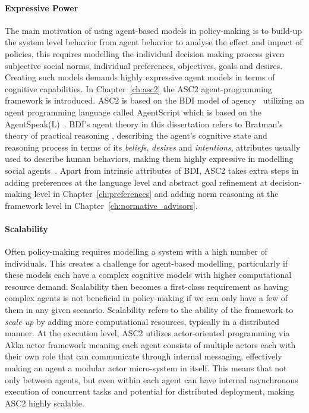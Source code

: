 \paragraph{Expressive Power} The main motivation of using agent-based models in policy-making is to build-up the system level behavior from agent behavior to analyse the effect and impact of policies, this requires  modelling the individual decision making process given subjective social norms, individual preferences, objectives, goals and desires. Creating such models demands highly expressive agent models in terms of cognitive capabilities. In Chapter~\ref{ch:asc2} the ASC2 agent-programming framework is introduced. ASC2 is based on the BDI model of agency~\cite{Rao1995} utilizing an agent programming language called AgentScript which is based on the AgentSpeak(L)~\cite{RaoAS1996}. BDI's agent theory in this dissertation refers to Bratman's theory of practical reasoning \cite{bratman1987intention}, describing the agent's cognitive state and reasoning process in terms of its \textit{beliefs}, \textit{desires} and \textit{intentions}, attributes usually used to describe human behaviors, making them highly expressive in modelling social agents~\cite{Fisher2007}. Apart from intrinsic attributes of BDI, ASC2 takes extra steps in adding preferences at the language level and abstract goal refinement at decision-making level in Chapter~\ref{ch:preferences} and adding norm reasoning at the framework level in Chapter~\ref{ch:normative_advisors}.

\paragraph{Scalability} Often policy-making requires modelling a system with a high number of individuals. This creates a challenge for agent-based modelling, particularly if these models each have a complex cognitive models with higher computational resource demand. Scalability then becomes a first-class requirement as having complex agents is not beneficial in policy-making if we can only have a few of them in any given scenario. Scalability refers to the ability of the framework to \textit{scale up} by adding more computational resources, typically in a distributed manner. At the execution level, ASC2 utilizes actor-oriented programming via Akka actor framework meaning each agent consists of multiple actors each with their own role that can communicate through internal messaging, effectively making an agent a modular actor micro-system in itself. This means that not only between agents, but even within each agent can have internal asynchronous execution of concurrent tasks and potential for distributed deployment, making ASC2 highly scalable.
 
